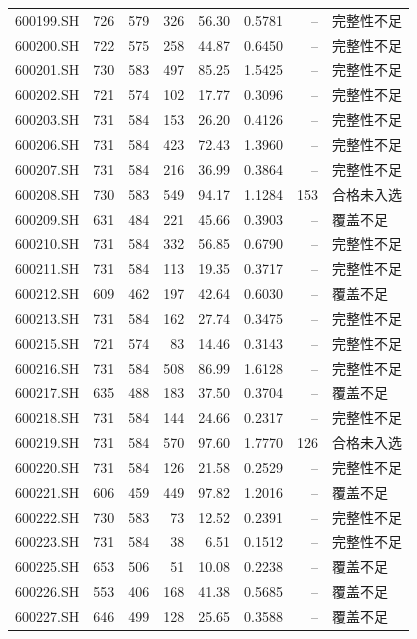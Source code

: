 \documentclass[10pt,a4paper]{article}
\begin{document}
\begin{longtable}{lrrr r r r l}
600199.SH & 726 & 579 & 326 & 56.30 & 0.5781 & -- & 完整性不足\\
600200.SH & 722 & 575 & 258 & 44.87 & 0.6450 & -- & 完整性不足\\
600201.SH & 730 & 583 & 497 & 85.25 & 1.5425 & -- & 完整性不足\\
600202.SH & 721 & 574 & 102 & 17.77 & 0.3096 & -- & 完整性不足\\
600203.SH & 731 & 584 & 153 & 26.20 & 0.4126 & -- & 完整性不足\\
600206.SH & 731 & 584 & 423 & 72.43 & 1.3960 & -- & 完整性不足\\
600207.SH & 731 & 584 & 216 & 36.99 & 0.3864 & -- & 完整性不足\\
600208.SH & 730 & 583 & 549 & 94.17 & 1.1284 & 153 & 合格未入选\\
600209.SH & 631 & 484 & 221 & 45.66 & 0.3903 & -- & 覆盖不足\\
600210.SH & 731 & 584 & 332 & 56.85 & 0.6790 & -- & 完整性不足\\
600211.SH & 731 & 584 & 113 & 19.35 & 0.3717 & -- & 完整性不足\\
600212.SH & 609 & 462 & 197 & 42.64 & 0.6030 & -- & 覆盖不足\\
600213.SH & 731 & 584 & 162 & 27.74 & 0.3475 & -- & 完整性不足\\
600215.SH & 721 & 574 & 83 & 14.46 & 0.3143 & -- & 完整性不足\\
600216.SH & 731 & 584 & 508 & 86.99 & 1.6128 & -- & 完整性不足\\
600217.SH & 635 & 488 & 183 & 37.50 & 0.3704 & -- & 覆盖不足\\
600218.SH & 731 & 584 & 144 & 24.66 & 0.2317 & -- & 完整性不足\\
600219.SH & 731 & 584 & 570 & 97.60 & 1.7770 & 126 & 合格未入选\\
600220.SH & 731 & 584 & 126 & 21.58 & 0.2529 & -- & 完整性不足\\
600221.SH & 606 & 459 & 449 & 97.82 & 1.2016 & -- & 覆盖不足\\
600222.SH & 730 & 583 & 73 & 12.52 & 0.2391 & -- & 完整性不足\\
600223.SH & 731 & 584 & 38 & 6.51 & 0.1512 & -- & 完整性不足\\
600225.SH & 653 & 506 & 51 & 10.08 & 0.2238 & -- & 覆盖不足\\
600226.SH & 553 & 406 & 168 & 41.38 & 0.5685 & -- & 覆盖不足\\
600227.SH & 646 & 499 & 128 & 25.65 & 0.3588 & -- & 覆盖不足\\

\end{longtable}
\end{document}
